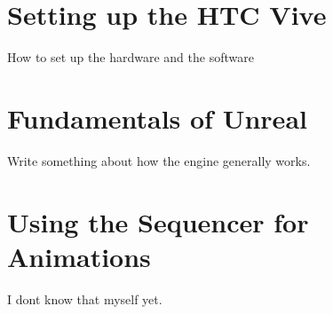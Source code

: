 

\section{Setting up the HTC Vive}

How to set up the hardware and the software

\section{Fundamentals of Unreal}

Write something about how the engine generally works.

\section{Using the Sequencer for Animations}

I dont know that myself yet.